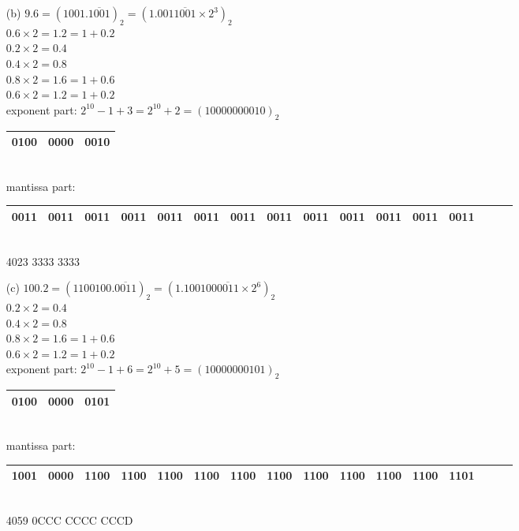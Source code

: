 \documentclass[UTF8]{ctexart}
\begin{document}
\begin{enumerate}
\begin{itemize}
\item[(b)] $9.6 = (1001.\overline{1001})_2 = (1.001\overline{1001} \times 2^{3})_2$ \\
$0.6 \times 2 = 1.2 = 1 + 0.2$ \\
$0.2 \times 2 = 0.4$ \\
$0.4 \times 2 = 0.8$ \\
$0.8 \times 2 = 1.6 = 1 + 0.6$ \\
$0.6 \times 2 = 1.2 = 1 + 0.2$ \\
exponent part: $2^{10} - 1 + 3 = 2^{10} + 2 = (100 0000 0010)_2$ \\
\begin{tabular}{|c|c|c|}
\hline
0100 & 0000 & 0010\\
\hline
\end{tabular} \\
mantissa part: \\
\begin{tabular}{|c|c|c|c|c|c|c|c|c|c|c|c|c|c|c|c|}
\hline
0011&0011&0011&0011&0011&0011&0011&0011&0011&0011&0011&0011&0011\\
\hline
\end{tabular} \\
4023 3333 3333

\item[(c)] $100.2 = (110 0100.\overline{0011})_2 = (1.100100\overline{0011}\times 2^6)_2$ \\
$0.2 \times 2 = 0.4$ \\
$0.4 \times 2 = 0.8$ \\
$0.8 \times 2 = 1.6 = 1 + 0.6$ \\
$0.6 \times 2 = 1.2 = 1 + 0.2$ \\
exponent part: $2^{10} - 1 + 6 = 2^{10} + 5 = (100 0000 0101)_2$ \\
\begin{tabular}{|c|c|c|}
\hline
0100 & 0000 & 0101\\
\hline
\end{tabular} \\
mantissa part: \\
\begin{tabular}{|c|c|c|c|c|c|c|c|c|c|c|c|c|c|c|c|}
\hline
1001&0000&1100&1100&1100&1100&1100&1100&1100&1100&1100&1100&1101\\
\hline
\end{tabular} \\
4059 0CCC CCCC CCCD


\end{itemize}
\end{enumerate}
\end{document}
